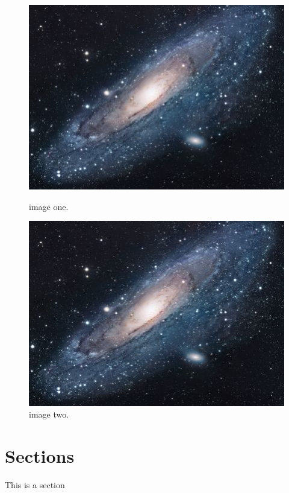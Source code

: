 \documentclass{article}
\begin{document}
\begin{figure}[!tbp]
  \centering
  \begin{minipage}[b]{0.4\textwidth}
    \includegraphics[width=\textwidth]{universe.jpg}
    \caption{image one.}
  \end{minipage}
  \hfill
  \begin{minipage}[b]{0.4\textwidth}
    \includegraphics[width=\textwidth]{universe.jpg}
    \caption{image two.}
  \end{minipage}
\end{figure}

\section{Sections}
This is a section
\end{document}
